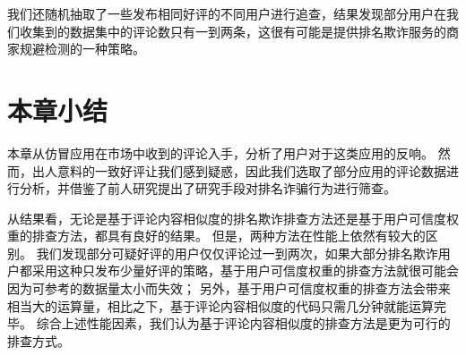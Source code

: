 我们还随机抽取了一些发布相同好评的不同用户进行追查，结果发现部分用户在我们收集到的数据集中的评论数只有一到两条，这很有可能是提供排名欺诈服务的商家规避检测的一种策略。

\section{本章小结}
本章从仿冒应用在市场中收到的评论入手，分析了用户对于这类应用的反响。
然而，出人意料的一致好评让我们感到疑惑，因此我们选取了部分应用的评论数据进行分析，并借鉴了前人研究提出了研究手段对排名诈骗行为进行筛查。

从结果看，无论是基于评论内容相似度的排名欺诈排查方法还是基于用户可信度权重的排查方法，都具有良好的结果。
但是，两种方法在性能上依然有较大的区别。
我们发现部分可疑好评的用户仅仅评论过一到两次，如果大部分排名欺诈用户都采用这种只发布少量好评的策略，基于用户可信度权重的排查方法就很可能会因为可参考的数据量太小而失效；
另外，基于用户可信度权重的排查方法会带来相当大的运算量，相比之下，基于评论内容相似度的代码只需几分钟就能运算完毕。
综合上述性能因素，我们认为基于评论内容相似度的排查方法是更为可行的排查方式。
